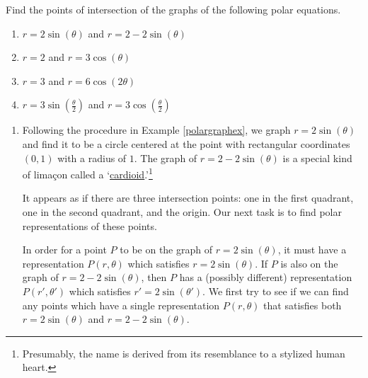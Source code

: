 \documentclass{ximera}
\begin{document}
\begin{example}  \label{polargraphintex} Find the points of intersection of the graphs of the following polar equations.

\begin{enumerate}

\item  \label{circcardint} $r =2\sin(\theta)$ and $r = 2 - 2\sin(\theta)$
\item  $r = 2$ and $r = 3\cos(\theta)$
\item \label{circroseint} $r=3$ and  $r = 6\cos(2\theta)$
\item  \label{samepolarcurveex} $r = 3\sin\left(\frac{\theta}{2}\right)$ and  $r = 3\cos\left(\frac{\theta}{2}\right)$ 

\end{enumerate}

\begin{explanation}

\begin{enumerate}

\item  Following the procedure in Example \ref{polargraphex}, we graph $r = 2\sin(\theta)$ and find it to be a circle centered at the point with rectangular coordinates $(0,1)$ with a radius of $1$.  The graph of $r = 2-2\sin(\theta)$ is a special kind of lima\c{c}on called a  `\href{http://en.wikipedia.org/wiki/Cardioid}{\underline{cardioid}}.'\footnote{Presumably, the name is derived from its resemblance to a stylized human heart.}

\begin{center}
\end{center}

It appears as if there are three intersection points:  one in the first quadrant, one in the second quadrant, and the origin.  Our next task is to find polar representations of these points. 


 In order for a point $P$ to be on the graph of $r = 2\sin(\theta)$, it must have a representation $P(r,\theta)$ which satisfies $r = 2\sin(\theta)$.  If $P$ is also on the graph of $r = 2 - 2\sin(\theta)$, then $P$ has a (possibly different) representation $P(r',\theta')$ which satisfies $r'=2\sin(\theta')$.   We first try to see if we can find any points which have a single representation $P(r,\theta)$ that satisfies both $r = 2\sin(\theta)$ and $r = 2-2\sin(\theta)$.  
 

\end{enumerate}
\end{explanation}
\end{example}
\end{document}
